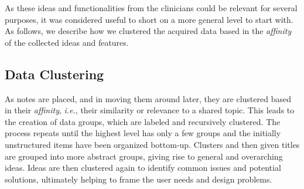 As these ideas and functionalities from the clinicians could be relevant for several purposes, it was considered useful to short on a more general level to start with.
As follows, we describe how we clustered the acquired data based in the {\it affinity} of the collected ideas and features.

\subsection{Data Clustering}
\label{sec:sec00504}

As notes are placed, and in moving them around later, they are clustered based in their {\it affinity}, {\it i.e.}, their similarity or relevance to a shared topic.
This leads to the creation of data groups, which are labeled and recursively clustered.
The process repeats until the highest level has only a few groups and the initially unstructured items have been organized bottom-up.
Clusters and then given titles are grouped into more abstract groups, giving rise to general and overarching ideas.
Ideas are then clustered again to identify common issues and potential solutions, ultimately helping to frame the user needs and design problems.